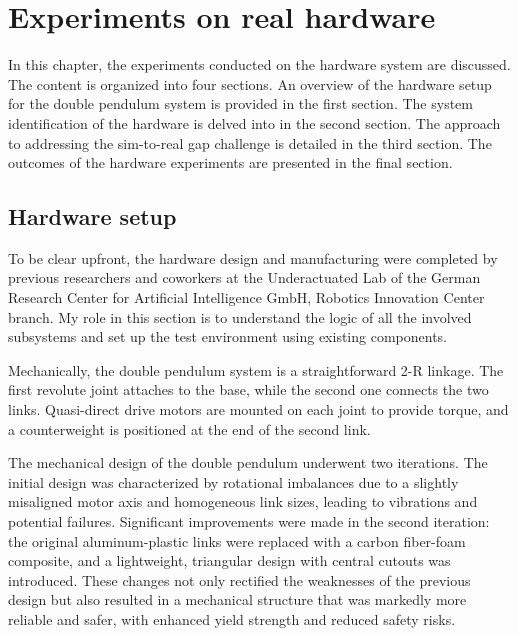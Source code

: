 \chapter{Experiments on real hardware}
In this chapter, the experiments conducted on the hardware system are discussed. The content is organized into four sections. An overview of the hardware setup for the double pendulum system is provided in the first section. The system identification of the hardware is delved into in the second section. The approach to addressing the sim-to-real gap challenge is detailed in the third section. The outcomes of the hardware experiments are presented in the final section.

\section{Hardware setup}
To be clear upfront, the hardware design and manufacturing were completed by previous researchers and coworkers at the Underactuated Lab of the German Research Center for Artificial Intelligence GmbH, Robotics Innovation Center branch. My role in this section is to understand the logic of all the involved subsystems and set up the test environment using existing components.

Mechanically, the double pendulum system is a straightforward 2-R linkage. The first revolute joint attaches to the base, while the second one connects the two links. Quasi-direct drive motors are mounted on each joint to provide torque, and a counterweight is positioned at the end of the second link.

The mechanical design of the double pendulum underwent two iterations. The initial design was characterized by rotational imbalances due to a slightly misaligned motor axis and homogeneous link sizes, leading to vibrations and potential failures. Significant improvements were made in the second iteration: the original aluminum-plastic links were replaced with a carbon fiber-foam composite, and a lightweight, triangular design with central cutouts was introduced. These changes not only rectified the weaknesses of the previous design but also resulted in a mechanical structure that was markedly more reliable and safer, with enhanced yield strength and reduced safety risks.

